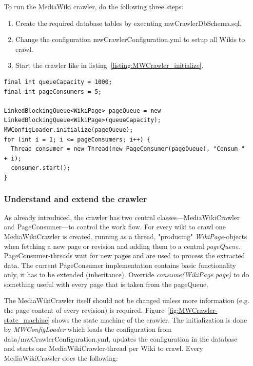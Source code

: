 \documentclass[a4paper,twoside]{book}      %
\begin{document}
To run the MediaWiki crawler, do the following three steps: 
\begin{enumerate}
	\item Create the required database tables by executing mwCrawlerDbSchema.sql.
	\item Change the configuration mwCrawlerConfiguration.yml to setup all Wikis to crawl.
	\item Start the crawler like in listing~\ref{listing:MWCrawler_initialize}.
\end{enumerate}  

\begin{codelisting}
\begin{lstlisting}[caption=MediaWiki crawler initialization.,frame=tb,breaklines=true,label=listing:MWCrawler_initialize]
final int queueCapacity = 1000;
final int pageConsumers = 5;

LinkedBlockingQueue<WikiPage> pageQueue = new LinkedBlockingQueue<WikiPage>(queueCapacity);
MWConfigLoader.initialize(pageQueue);
for (int i = 1; i <= pageConsumers; i++) {
  Thread consumer = new Thread(new PageConsumer(pageQueue), "Consum-" + i);
  consumer.start();
}
\end{lstlisting}
\end{codelisting}

\subsubsection{Understand and extend the crawler}\label{sec:mw_extend}

As already introduced, the crawler has two central classes---MediaWikiCrawler and PageConsumer---to control the work flow. For every wiki to crawl one MediaWikiCrawler is created, running as a thread, "producing" \emph{WikiPage}-objects when fetching a new page or revision and adding them to a central \emph{pageQueue}. PageConsumer-threads wait for new pages and are used to process the extracted data. The current PageConsumer implementation contains basic functionality only, it has to be extended (inheritance). Override \emph{consume(WikiPage page)} to do something useful with every page that is taken from the pageQueue. 

The MediaWikiCrawler itself should not be changed unless more information (e.g. the page content of every revision) is required. Figure~\ref{fig:MWCrawler-state_machine} shows the state machine of the crawler. The initialization is done by \emph{MWConfigLoader} which loads the configuration from data/mwCrawlerConfiguration.yml, updates the configuration in the database and starts one MediaWikiCrawler-thread per Wiki to crawl. Every MediaWikiCrawler does the following: 
\end{document}
